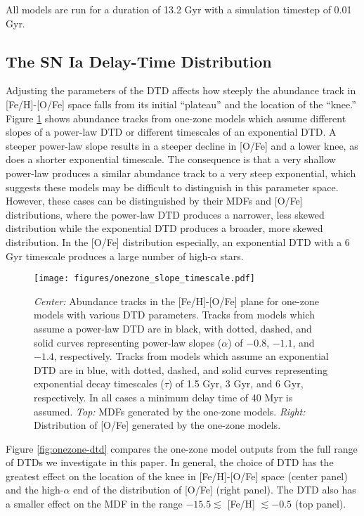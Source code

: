 \documentclass[twocolumn]{aastex631}
\begin{document}
All models are run for a duration of 13.2 Gyr with a simulation timestep of 0.01 Gyr.

\subsection{The SN Ia Delay-Time Distribution}

Adjusting the parameters of the DTD affects how steeply the abundance track in [Fe/H]-[O/Fe] space falls from its initial ``plateau'' and the location of the ``knee.'' Figure \ref{fig:onezone-slope-timescale} shows abundance tracks from one-zone models which assume different slopes of a power-law DTD or different timescales of an exponential DTD. A steeper power-law slope results in a steeper decline in [O/Fe] and a lower knee, as does a shorter exponential timescale. The consequence is that a very shallow power-law produces a similar abundance track to a very steep exponential, which suggests these models may be difficult to distinguish in this parameter space. However, these cases can be distinguished by their MDFs and [O/Fe] distributions, where the power-law DTD produces a narrower, less skewed distribution while the exponential DTD produces a broader, more skewed distribution. In the [O/Fe] distribution especially, an exponential DTD with a 6 Gyr timescale produces a large number of high-$\alpha$ stars.

\begin{figure}
    \centering
    \texttt{[image: figures/onezone\_slope\_timescale.pdf]}
    \caption{\textit{Center:} Abundance tracks in the [Fe/H]-[O/Fe] plane for one-zone models with various DTD parameters. Tracks from models which assume a power-law DTD are in black, with dotted, dashed, and solid curves representing power-law slopes ($\alpha$) of $-0.8$, $-1.1$, and $-1.4$, respectively. Tracks from models which assume an exponential DTD are in blue, with dotted, dashed, and solid curves representing exponential decay timescales ($\tau$) of 1.5 Gyr, 3 Gyr, and 6 Gyr, respectively. In all cases a minimum delay time of 40 Myr is assumed. \textit{Top:} MDFs generated by the one-zone models. \textit{Right:} Distribution of [O/Fe] generated by the one-zone models.}
    \label{fig:onezone-slope-timescale}
\end{figure}

Figure \ref{fig:onezone-dtd} compares the one-zone model outputs from the full range of DTDs we investigate in this paper. In general, the choice of DTD has the greatest effect on the location of the knee in [Fe/H]-[O/Fe] space (center panel) and the high-$\alpha$ end of the distribution of [O/Fe] (right panel). The DTD also has a smaller effect on the MDF in the range $-15.5\lesssim$ [Fe/H] $\lesssim-0.5$ (top panel).
\end{document}
